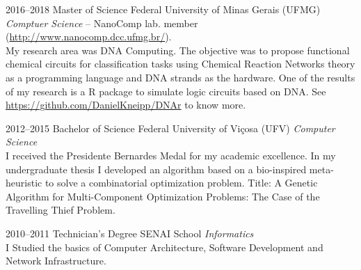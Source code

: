 \documentclass[a4paper]{cv-friggeri-x}
\begin{document}
\begin{entrylist}

\entry
    {2016--2018}
    {Master {\normalfont of Science}}
    {Federal University of Minas Gerais (UFMG)}
    {\emph{Comptuer Science} -- 
    \footnotesize{NanoComp lab. member (\href{http://www.nanocomp.dcc.ufmg.br/}{http://www.nanocomp.dcc.ufmg.br/}).}\\
    \normalsize{My research area was DNA Computing. The objective was to propose functional chemical circuits for classification tasks using Chemical Reaction Networks theory as a programming language and DNA strands as the hardware. One of the results of my research is a R package to simulate logic circuits based on DNA. See \href{https://github.com/DanielKneipp/DNAr}{https://github.com/DanielKneipp/DNAr} to know more.}}

\entry
    {2012--2015}
    {Bachelor {\normalfont of Science}}
    {Federal University of Vi\c cosa (UFV)}
    {\emph{Computer Science}\\
    I received the Presidente Bernardes Medal for my academic excellence. In my undergraduate thesis I developed an algorithm based on a bio-inspired meta-heuristic to solve a combinatorial optimization problem. Title: A Genetic Algorithm for Multi-Component Optimization Problems: The Case of the Travelling Thief Problem.}


\entry
    {2010--2011}
    {Technician's {\normalfont Degree}}
    {SENAI School}
    {\emph{Informatics}\\
    I Studied the basics of Computer Architecture, Software Development and Network Infrastructure.}



\end{entrylist}

\end{document}
